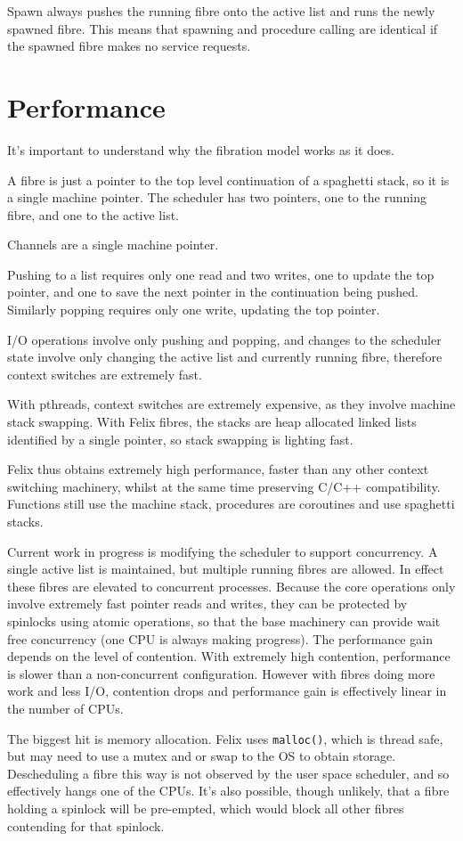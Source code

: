 \documentclass[oneside]{book}
\begin{document}
Spawn always pushes the running fibre onto the active list and runs
the newly spawned fibre. This means that spawning and procedure
calling are identical if the spawned fibre makes no service
requests.

\section{Performance}
It's important to understand why the fibration model works as it does.

A fibre is just a pointer to the top level continuation of a spaghetti stack, so it is
a single machine pointer. The scheduler has two pointers, one to the running
fibre, and one to the active list.

Channels are a single machine pointer.

Pushing to a list requires only one read and two writes,
one to update the top pointer, and one to save the next pointer 
in the continuation being pushed. Similarly popping requires
only one write, updating the top pointer.

I/O operations involve only pushing and popping, and changes to the
scheduler state involve only changing the active list and currently
running fibre, therefore context switches are extremely fast.

With pthreads, context switches are extremely expensive, as they
involve machine stack swapping. With Felix fibres, the stacks are
heap allocated linked lists identified by a single pointer,
so stack swapping is lighting fast. 

Felix thus obtains extremely high performance, faster than any
other context switching machinery, whilst at the same time
preserving C/C++ compatibility. Functions still use the machine stack,
procedures are coroutines and use spaghetti stacks.

Current work in progress is modifying the scheduler to support
concurrency. A single active list is maintained, but multiple
running fibres are allowed. In effect these fibres are elevated
to concurrent processes. Because the core operations only involve
extremely fast pointer reads and writes, they can be protected by
spinlocks using atomic operations, so that the base machinery
can provide wait free concurrency (one CPU is always making progress).
The performance gain depends on the level of contention. With extremely
high contention, performance is slower than a non-concurrent configuration.
However with fibres doing more work and less I/O, contention drops and
performance gain is effectively linear in the number of CPUs.

The biggest hit is memory allocation. Felix uses \verb$malloc()$, which
is thread safe, but may need to use a mutex and or swap to the OS to
obtain storage. Descheduling a fibre this way is not observed by the
user space scheduler, and so effectively hangs one of the CPUs.
It's also possible, though unlikely, that a fibre holding a spinlock
will be pre-empted, which would block all other fibres contending
for that spinlock.


\clearpage
{}
{}
\listoflistings
%
\clearpage
{}
\printindex[codeindex] 
%
\clearpage
{}
\printindex
%
\end{document}
